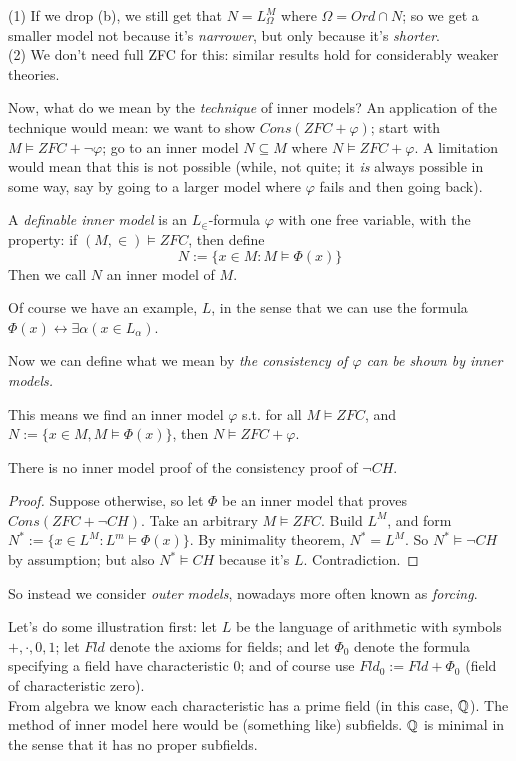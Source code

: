\documentclass[a4paper]{article}
\begin{document}
\begin{rem}
(1) If we drop (b), we still get that $N=L_\Omega^M$ where $\Omega = Ord \cap N$; so we get a smaller model not because it's \emph{narrower}, but only because it's \emph{shorter}.\\
(2) We don't need full ZFC for this: similar results hold for considerably weaker theories.
\end{rem}

Now, what do we mean by the \emph{technique} of inner models? An application of the technique would mean: we want to show $Cons(ZFC+\varphi)$; start with $M \vDash ZFC+\neg \varphi$; go to an inner model $N \subseteq M$ where $N \vDash ZFC+\varphi$. A limitation would mean that this is not possible (while, not quite; it \emph{is} always possible in some way, say by going to a larger model where $\varphi$ fails and then going back).

\begin{defi}
A \emph{definable inner model} is an $L_\in$-formula $\varphi$ with one free variable, with the property: if $(M,\in) \vDash ZFC$, then define
\[
N:= \{ x \in M: M \vDash \Phi(x)\}
\]
Then we call $N$ an inner model of $M$.
\end{defi}

Of course we have an example, $L$, in the sense that we can use the formula $\Phi(x) \leftrightarrow \exists \alpha (x \in L_\alpha)$.

Now we can define what we mean by \emph{the consistency of $\varphi$ can be shown by inner models.}

This means we find an inner model $\varphi$ s.t. for all $M \vDash ZFC$, and $N := \{x \in M, M \vDash \Phi(x)\}$, then $N \vDash ZFC+\varphi$.

\begin{coro}
There is no inner model proof of the consistency proof of $\neg CH$.
\begin{proof}
Suppose otherwise, so let $\Phi$ be an inner model that proves $Cons(ZFC+\neg CH)$. Take an arbitrary $M \vDash ZFC$. Build $L^M$, and form $N^*:=\{x \in L^M: L^m \vDash \Phi(x)\}$. By minimality theorem, $N^* = L^M$. So $N^* \vDash \neg CH$ by assumption; but also $N^* \vDash CH$ because it's $L$. Contradiction.
\end{proof}
\end{coro}

So instead we consider \emph{outer models}, nowadays more often known as \emph{forcing}.

Let's do some illustration first: let $L$ be the language of arithmetic with symbols $+,\cdot,0,1$; let $Fld$ denote the axioms for fields; and let $\Phi_0$ denote the formula specifying a field have characteristic 0; and of course use $Fld_0 := Fld+\Phi_0$ (field of characteristic zero).\\
From algebra we know each characteristic has a prime field (in this case, $\mathbb{Q}$). The method of inner model here would be (something like) subfields. $\mathbb{Q}$ is minimal in the sense that it has no proper subfields.
\end{document}
